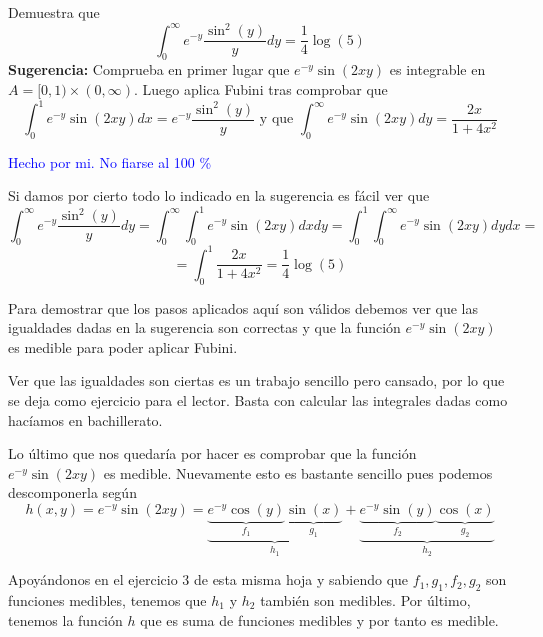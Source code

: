 \begin{problem}[5]
Demuestra que
\[\int_0^{\infty}e^{-y}\frac{\sin^2(y)}{y}dy=\frac{1}{4}\log(5)\]
\textbf{Sugerencia:} Comprueba en primer lugar que $e^{-y}\sin(2xy)$ es integrable en $A=[0,1)\times(0,\infty)$. Luego aplica Fubini tras comprobar que
\[\int_0^1e^{-y}\sin(2xy)dx=e^{-y}\frac{\sin^2(y)}{y} \text{ y que } \int_0^{\infty}e^{-y}\sin(2xy)dy = \frac{2x}{1+4x^2}\]

\solution
\textcolor{blue}{Hecho por mi. No fiarse al 100 \%}

Si damos por cierto todo lo indicado en la sugerencia es fácil ver que
\[\int_0^{\infty}e^{-y}\frac{\sin^2(y)}{y}dy = \int_0^{\infty}\int_0^1e^{-y}\sin(2xy)dxdy = \int_0^1\int_0^{\infty}e^{-y}\sin(2xy)dydx = \]
\[=\int_0^1\frac{2x}{1+4x^2} =\frac{1}{4}\log(5)\]

Para demostrar que los pasos aplicados aquí son válidos debemos ver que las igualdades dadas en la sugerencia son correctas y que la función $e^{-y}\sin(2xy)$ es medible para poder aplicar Fubini.

Ver que las igualdades son ciertas es un trabajo sencillo pero cansado, por lo que se deja como ejercicio para el lector. Basta con calcular las integrales dadas como hacíamos en bachillerato.

Lo último que nos quedaría por hacer es comprobar que la función $e^{-y}\sin(2xy)$ es medible. Nuevamente esto es bastante sencillo pues podemos descomponerla según
\[h(x,y)=e^{-y}\sin(2xy)=\underbrace{\underbrace{e^{-y}\cos(y)}_{f_1}\underbrace{\sin(x)}_{g_1}}_{h_1}+\underbrace{\underbrace{e^{-y}\sin(y)}_{f_2}\underbrace{\cos(x)}_{g_2}}_{h_2}\]

Apoyándonos en el ejercicio 3 de esta misma hoja y sabiendo que $f_1,g_1,f_2,g_2$ son funciones medibles, tenemos que $h_1$ y $h_2$ también son medibles. Por último, tenemos la función $h$ que es suma de funciones medibles y por tanto es medible.
\end{problem}